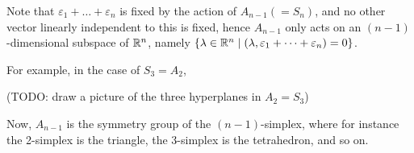 Note that $\varepsilon_1 + \dots + \varepsilon_n$ is fixed by the action of
$A_{n-1} (= S_n)$, and no other vector linearly independent to this is fixed,
hence $A_{n-1}$ only acts on an $(n-1)$-dimensional subspace of $\mathbb{R}^n$, namely
$\{\lambda \in \mathbb{R}^n \mid (\lambda, \varepsilon_1 + \dots + \varepsilon_n) = 0\}$.

For example, in the case of $S_3 = A_2$,


(TODO: draw a picture of the three hyperplanes in $A_2 = S_3$)

Now, $A_{n-1}$ is the symmetry group of the $(n-1)$-simplex, where for instance
the 2-simplex is the triangle, the 3-simplex is the tetrahedron, and so on.
